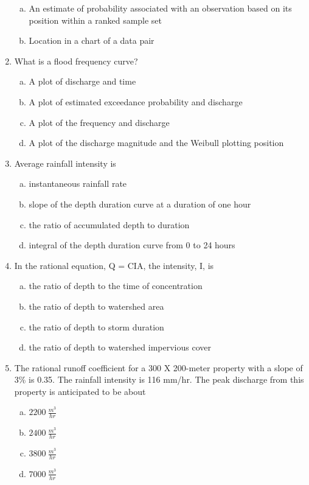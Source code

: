 \documentclass[12pt]{article}
\begin{document}
\begin{enumerate}
\begin{enumerate}[a)]
\item An estimate of probability associated with an observation based on its position within a ranked sample set
\item Location in a chart of a data pair
\end{enumerate}
\clearpage
\item What is a flood frequency curve?
\begin{enumerate}[a)]
\item A plot of discharge and time
\item A plot of estimated exceedance probability and discharge
\item A plot of the frequency and discharge
\item A plot of the discharge magnitude and the Weibull plotting position
\end{enumerate}
\clearpage
\item Average rainfall intensity is 
\begin{enumerate}[a)]
\item instantaneous rainfall rate
\item slope of the depth duration curve at a duration of one hour
\item the ratio of accumulated depth to duration
\item integral of the depth duration curve from 0 to 24 hours
\end{enumerate}
\clearpage
\item In the rational equation, Q = CIA, the intensity, I, is
\begin{enumerate}[a)]
\item the ratio of depth to the time of concentration
\item the ratio of depth to watershed area
\item the ratio of depth to storm duration
\item the ratio of depth to watershed impervious cover
\end{enumerate}
\clearpage

\item The rational runoff coefficient for a 300 X 200-meter property with a slope of 3\% is 0.35. The rainfall intensity is 116 mm/hr. The peak discharge from this property is anticipated to be about

\begin{enumerate}[a)]
\item $2200~\frac{m^3}{hr}$
\item $2400~\frac{m^3}{hr}$%
\item $3800~\frac{m^3}{hr}$
\item $7000~\frac{m^3}{hr}$
\end{enumerate}
\clearpage


\end{enumerate}
\end{document}
